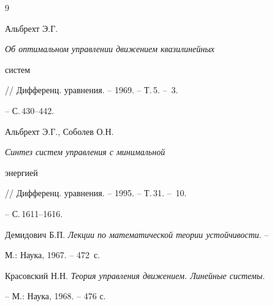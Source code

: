 

 


\begin{thebibliography}{9} 


 




Альбрехт Э.Г. {\em Об оптимальном управлении движением квазилинейных 


систем} // Дифференц. уравнения. -- 1969. -- Т.\,5. -- \No\,3. 


-- С.\,430--442. 




Альбрехт Э.Г., Соболев О.Н. {\em Синтез систем управления с минимальной 


энергией} // Дифференц. уравнения. -- 1995. -- Т.\,31. -- \No\,10. 


-- С.\,1611--1616. 




Демидович Б.П. {\em Лекции по математической теории устойчивости}. -- 


М.: Наука, 1967. -- 472~с. 




Красовский Н.Н. {\em Теория управления движением. Линейные системы}. 


-- М.: Наука, 1968. -- 476 с. 


 


\end{thebibliography} 


